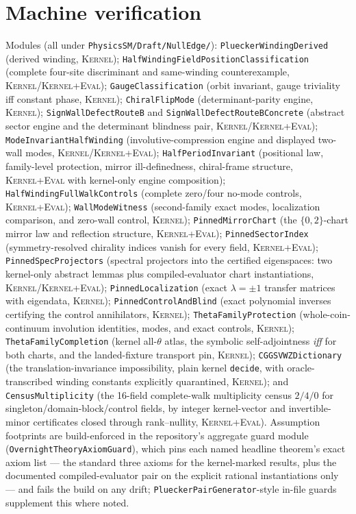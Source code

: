 \documentclass[11pt]{article}
\newcommand{\Kernel}{\textcolor{kernelcolor}{\textsc{Kernel}}}
\newcommand{\DraftTrust}{\textcolor{draftcolor}{\textsc{Kernel+Eval}}}
\begin{document}
\appendix
\section{Machine verification}

Modules (all under \texttt{PhysicsSM/Draft/NullEdge/}):
\texttt{PlueckerWindingDerived} (derived winding, \Kernel{});
\texttt{HalfWindingFieldPositionClassification} (complete four-site
discriminant and same-winding counterexample, \Kernel{}/\DraftTrust{});
\texttt{GaugeClassification} (orbit invariant, gauge triviality iff
constant phase, \Kernel{}); \texttt{ChiralFlipMode} (determinant-parity
engine, \Kernel{}); \texttt{SignWallDefectRouteB} and
\texttt{SignWallDefectRouteBConcrete} (abstract sector engine and the
determinant blindness pair, \Kernel{}/\DraftTrust{});
\texttt{ModeInvariantHalfWinding} (involutive-compression engine and displayed
two-wall modes, \Kernel{}/\DraftTrust{});
\texttt{HalfPeriodInvariant} (positional law, family-level protection,
mirror ill-definedness, chiral-frame structure, \DraftTrust{} with
kernel-only engine composition);
\texttt{HalfWindingFullWalkControls} (complete zero/four no-mode controls,
\DraftTrust{}); \texttt{WallModeWitness} (second-family exact modes,
localization comparison, and zero-wall control, \Kernel{});
\texttt{PinnedMirrorChart} (the $\{0,2\}$-chart mirror law and
reflection structure, \DraftTrust{}); \texttt{PinnedSectorIndex}
(symmetry-resolved chirality indices vanish for every field,
\DraftTrust{}); \texttt{PinnedSpecProjectors} (spectral projectors into
the certified eigenspaces: two kernel-only abstract lemmas plus
compiled-evaluator chart instantiations, \Kernel{}/\DraftTrust{});
\texttt{PinnedLocalization} (exact
$\lambda=\pm1$ transfer matrices with eigendata, \Kernel{});
\texttt{PinnedControlAndBlind} (exact polynomial inverses certifying the
control annihilators, \Kernel{});
\texttt{ThetaFamilyProtection} (whole-coin-continuum involution
identities, modes, and exact controls, \Kernel{});
\texttt{ThetaFamilyCompletion} (kernel all-$\theta$ atlas, the symbolic
self-adjointness \emph{iff} for both charts, and the landed-fixture
transport pin, \Kernel{}); \texttt{CGGSVWZDictionary} (the
translation-invariance impossibility, plain kernel \texttt{decide}, with
oracle-transcribed winding constants explicitly quarantined,
\Kernel{}); and \texttt{CensusMultiplicity} (the 16-field complete-walk
multiplicity census $2/4/0$ for singleton/domain-block/control fields,
by integer kernel-vector and invertible-minor certificates closed
through rank--nullity, \DraftTrust{}).
Assumption footprints are build-enforced in the repository's aggregate
guard module (\texttt{OvernightTheoryAxiomGuard}), which pins each named
headline theorem's exact axiom list --- the standard three axioms for the
kernel-marked results, plus the documented compiled-evaluator pair on
the explicit rational instantiations only --- and fails the build on any
drift; \texttt{PlueckerPairGenerator}-style in-file guards supplement
this where noted.
\end{document}
